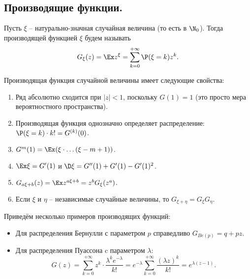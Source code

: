 \subsection{Производящие функции.}
\begin{definition}
    Пусть $\xi$ -- натурально-значная случайная величина (то есть в $\N_0$).
    Тогда производящей функцией $\xi$ будем называть
    \[
        G_{\xi}(z) = \Ex z^{\xi} = \sum\limits_{k = 0}^{+\infty} \P(\xi = k)z^k.
    \]
\end{definition}
Производящая функция случайной величины имеет следующие свойства:
\begin{enumerate}
    \item Ряд абсолютно сходится при $|z| < 1$, поскольку $G(1) = 1$ (это просто мера вероятностного пространства).
    \item Производящая функция однозначно определяет распределение: $\P(\xi = k)\cdot k! = G^{(k)}(0)$.
    \item $G^{m}(1) = \Ex (\xi \cdot \ldots (\xi - m + 1))$.
    \item $\Ex \xi = G'(1)$ и $\D \xi = G''(1) + G'(1) - G'(1)^2$.
    \item $G_{a\xi + b}(z) = \Ex z^{a\xi + b} = z^b G_{\xi}(z^a)$.
    \item Если $\xi$ и $\eta$ -- независимые случайные величины, то $G_{\xi + \eta} = G_{\xi}G_{\eta}$.
\end{enumerate}
\begin{example}
    Приведём несколько примеров производящих функций:
    \begin{itemize}
        \item Для распределения Бернулли с параметром $p$ справедливо $G_{Be(p)} = q + pz$.
        \item Для распределения Пуассона c параметром $\lambda$:
        \[
            G(z) = \sum\limits_{k = 0}^{+\infty} z^k \cdot \dfrac{\lambda^k e^{-\lambda}}{k!} = e^{-\lambda} \sum\limits_{k = 0}^{+\infty} \dfrac{(\lambda z)^k}{k!} = e^{\lambda(z - 1)}.
        \]
    \end{itemize}
\end{example}
